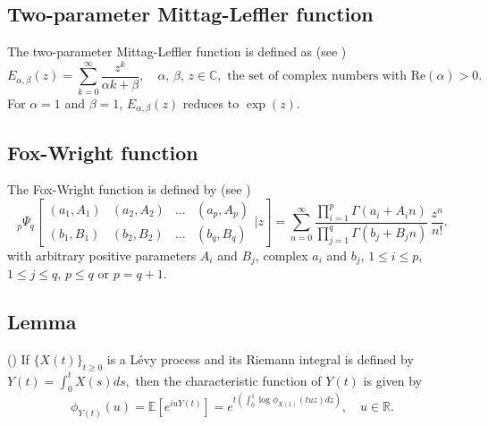 \documentclass[11pt,oneside,reqno]{amsart}
\theoremstyle{definition}
\theoremstyle{remarkstyle}
\begin{document}
\subsection{Two-parameter Mittag-Leffler function}
The two-parameter Mittag-Leffler function is defined as (see \citet{Prajapati2012})
\begin{equation*}
E_{\alpha,\beta}(z)=\sum_{k=0}^{\infty}\frac{z^k}{\alpha k+\beta},\quad\alpha,\,\beta,\,z\in\mathbb{C},\,\, \text{the set of complex numbers with Re}(\alpha)>0.
\end{equation*}
For $\alpha=1$ and $\beta=1$, $E_{\alpha,\beta}(z)$ reduces to $\exp(z)$.

\subsection{Fox-Wright function}\label{Generalized Wright function} 
The Fox-Wright function is defined by (see \citet{Konovska2024})
\begin{equation*}
    {}_{p}\Psi_{q}\!\left[
\begin{array}{cccc}
(a_{1},A_{1}) & (a_{2},A_{2}) & \ldots & (a_{p},A_{p})\\
(b_{1},B_{1}) & (b_{2},B_{2}) & \ldots & (b_{q},B_{q})
\end{array}
\bigg| z
\right]
=\sum_{n=0}^{\infty}
\frac{\prod_{i=1}^{p}
\Gamma(a_{i}+A_{i}n)}{\prod_{j=1}^{q}
\Gamma(b_{j}+B_{j}n)}
\,\frac{z^{n}}{n!}.
\end{equation*}
with arbitrary positive parameters $A_i$ and $B_j$, complex $a_i$ and $b_j$, $1\le i\le p$, $1\le j \le q$, $ p \le q$ or $p = q + 1$.


\subsection{Lemma} (\citet{Xia2018}) If $\{X(t)\}_{t\ge 0}$ is a L\'{e}vy process and its Riemann integral is defined by $Y(t)=\int_{0}^{t}X(s)ds,$
then the characteristic function of $Y(t)$ is given by
\begin{equation*}
    \phi_{Y(t)}(u)=\mathbb{E}[e^{iuY(t)}]=e^{t(\int_{0}^{1}\log\phi_{X(1)}(tuz)dz)}, \quad u\in\mathbb{R}. \label{running average lemma}
\end{equation*}
\end{document}
